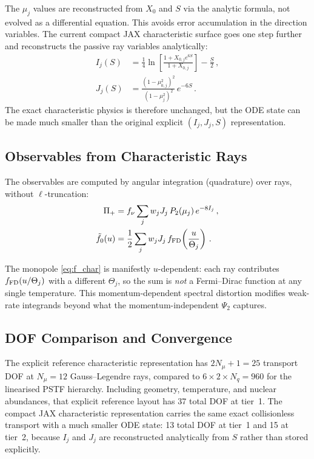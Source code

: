 The $\mu_j$ values are reconstructed from $X_0$ and $S$ via the analytic formula, not evolved as a differential equation.  This avoids error accumulation in the direction variables.  The current compact JAX characteristic surface goes one step further and reconstructs the passive ray variables analytically:
\begin{align}
I_j(S) &= \frac{1}{4}\ln\!\left[\frac{1 + X_{0,j}e^{6S}}{1 + X_{0,j}}\right] - \frac{S}{2}\,,\\
J_j(S) &= \frac{(1-\mu_{0,j}^2)^2}{(1-\mu_j^2)^2}\,e^{-6S}\,.
\end{align}
The exact characteristic physics is therefore unchanged, but the ODE state can be made much smaller than the original explicit $(I_j,J_j,S)$ representation.

\subsection{Observables from Characteristic Rays}

The observables are computed by angular integration (quadrature) over rays, without $\ell$-truncation:
\begin{align}
\Pi_+ &= f_\nu \sum_j w_j J_j\,P_2(\mu_j)\,e^{-8I_j}\,,\label{eq:Pi_char}\\
\tilde{f}_0(u) &= \frac{1}{2}\sum_j w_j J_j\,f_{\rm FD}\!\left(\frac{u}{\Theta_j}\right)\,.\label{eq:f_char}
\end{align}

The monopole \eqref{eq:f_char} is manifestly $u$-dependent: each ray contributes $f_{\rm FD}(u/\Theta_j)$ with a different $\Theta_j$, so the sum is \emph{not} a Fermi--Dirac function at any single temperature.  This momentum-dependent spectral distortion modifies weak-rate integrands beyond what the momentum-independent $\Psi_2$ captures.

\subsection{DOF Comparison and Convergence}

The explicit reference characteristic representation has $2N_\mu + 1 = 25$ transport DOF at $N_\mu = 12$ Gauss--Legendre rays, compared to $6 \times 2 \times N_q = 960$ for the linearised PSTF hierarchy.  Including geometry, temperature, and nuclear abundances, that explicit reference layout has 37 total DOF at tier~1.  The compact JAX characteristic representation carries the same exact collisionless transport with a much smaller ODE state: 13 total DOF at tier~1 and 15 at tier~2, because $I_j$ and $J_j$ are reconstructed analytically from $S$ rather than stored explicitly.

